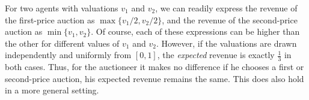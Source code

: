 For two agents with valuations $v_1$ and $v_2$, we can readily express the revenue of the first-price auction as $\max\{v_1/2,v_2/2\}$, and the revenue of the second-price auction as $\min\{v_1,v_2\}$. Of course, each of these expressions can be higher than the other for different values of $v_1$ and $v_2$. However, if the valuations are drawn independently and uniformly from $[0,1]$, the \emph{expected} revenue is exactly $\frac{1}{3}$ in both cases. Thus, for the auctioneer it makes no difference if he chooses a first or second-price auction, his expected revenue remains the same. This does also hold in a more general setting.



